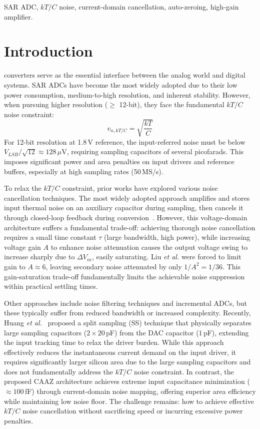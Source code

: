 \documentclass[journal]{IEEEtran}
\begin{document}
\begin{IEEEkeywords}
SAR ADC, $kT/C$ noise, current-domain cancellation, auto-zeroing, high-gain amplifier.
\end{IEEEkeywords}

\section{Introduction}
 converters serve as the essential interface between the analog world and digital systems. SAR ADCs have become the most widely adopted due to their low power consumption, medium-to-high resolution, and inherent stability. However, when pursuing higher resolution ($\ge$ 12-bit), they face the fundamental $kT/C$ noise constraint:
\begin{equation}
v_{n,kT/C} = \sqrt{\frac{kT}{C}}
\label{eq:ktc_basic}
\end{equation}
For 12-bit resolution at 1.8\,V reference, the input-referred noise must be below $V_{LSB}/\sqrt{12} \approx 128\,\mu$V, requiring sampling capacitors of several picofarads. This imposes significant power and area penalties on input drivers and reference buffers, especially at high sampling rates (50\,MS/s).

To relax the $kT/C$ constraint, prior works have explored various noise cancellation techniques. The most widely adopted approach amplifies and stores input thermal noise on an auxiliary capacitor during sampling, then cancels it through closed-loop feedback during conversion~\cite{liu202013bit}. However, this voltage-domain architecture suffers a fundamental trade-off: achieving thorough noise cancellation requires a small time constant $\tau$ (large bandwidth, high power), while increasing voltage gain $A$ to enhance noise attenuation causes the output voltage swing to increase sharply due to $\Delta V_{in}$, easily saturating. Liu \textit{et al.} were forced to limit gain to $A \approx 6$, leaving secondary noise attenuated by only $1/A^2 = 1/36$. This gain-saturation trade-off fundamentally limits the achievable noise suppression within practical settling times.

Other approaches include noise filtering techniques and incremental ADCs, but these typically suffer from reduced bandwidth or increased complexity. Recently, Huang \textit{et al.}~\cite{huang2025split} proposed a split sampling (SS) technique that physically separates large sampling capacitors ($2 \times 20$\,pF) from the DAC capacitor ($1$\,pF), extending the input tracking time to relax the driver burden. While this approach effectively reduces the instantaneous current demand on the input driver, it requires significantly larger silicon area due to the large sampling capacitors and does not fundamentally address the $kT/C$ noise constraint. In contrast, the proposed CAAZ architecture achieves extreme input capacitance minimization ($\approx 100$\,fF) through current-domain noise mapping, offering superior area efficiency while maintaining low noise floor. The challenge remains: how to achieve effective $kT/C$ noise cancellation without sacrificing speed or incurring excessive power penalties.
\end{document}
